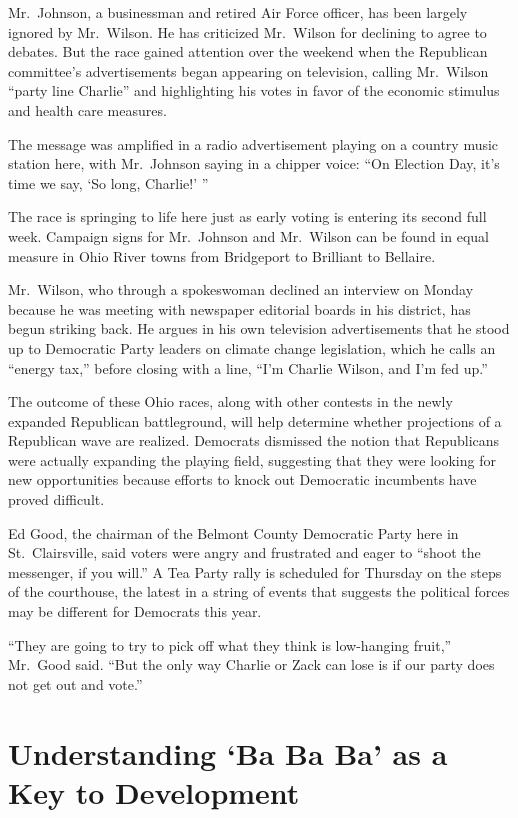 ﻿\documentclass[12pt]{article}
\begin{document}
Mr.~Johnson, a businessman and retired Air Force officer, has been largely ignored by Mr.~Wilson. He
has criticized Mr.~Wilson for declining to agree to debates. But the race gained attention over the
weekend when the Republican committee's advertisements began appearing on television, calling
Mr.~Wilson ``party line Charlie'' and highlighting his votes in favor of the economic stimulus and
health care measures.

The message was amplified in a radio advertisement playing on a country music station here, with
Mr.~Johnson saying in a chipper voice: ``On Election Day, it's time we say, `So long, Charlie!' ''

The race is springing to life here just as early voting is entering its second full week. Campaign
signs for Mr.~Johnson and Mr.~Wilson can be found in equal measure in Ohio River towns from
Bridgeport to Brilliant to Bellaire.

Mr.~Wilson, who through a spokeswoman declined an interview on Monday because he was meeting with
newspaper editorial boards in his district, has begun striking back. He argues in his own television
advertisements that he stood up to Democratic Party leaders on climate change legislation, which he
calls an ``energy tax,'' before closing with a line, ``I'm Charlie Wilson, and I'm fed up.''

The outcome of these Ohio races, along with other contests in the newly expanded Republican
battleground, will help determine whether projections of a Republican wave are realized. Democrats
dismissed the notion that Republicans were actually expanding the playing field, suggesting that
they were looking for new opportunities because efforts to knock out Democratic incumbents have
proved difficult.

Ed Good, the chairman of the Belmont County Democratic Party here in St.~Clairsville, said voters
were angry and frustrated and eager to ``shoot the messenger, if you will.'' A Tea Party rally is
scheduled for Thursday on the steps of the courthouse, the latest in a string of events that
suggests the political forces may be different for Democrats this year.

``They are going to try to pick off what they think is low-hanging fruit,'' Mr.~Good said. ``But the
only way Charlie or Zack can lose is if our party does not get out and vote.''

\section{Understanding `Ba Ba Ba' as a Key to Development}
\end{document}
